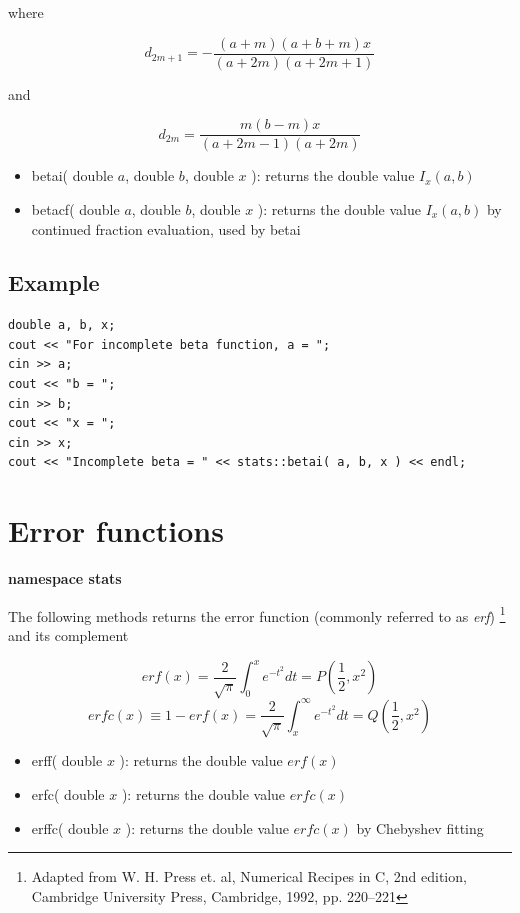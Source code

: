 \documentclass{report}
\begin{document}
where

\begin{equation}
d_{2m+1} = -\frac{(a+m)(a+b+m)x}{(a+2m)(a+2m+1)}
\end{equation}

and

\begin{equation}
d_{2m} = \frac{m(b-m)x}{(a+2m-1)(a+2m)}
\end{equation}

\begin{itemize}
\item betai( double $a$, double $b$, double $x$ ): returns the double
value $I_x(a,b)$
\item betacf( double $a$, double $b$, double $x$ ): returns the double
value $I_x(a,b)$
      by continued fraction evaluation, used by betai
\end{itemize}

\subsection{Example}
\begin{verbatim}
double a, b, x;
cout << "For incomplete beta function, a = ";
cin >> a;
cout << "b = ";
cin >> b;
cout << "x = ";
cin >> x;
cout << "Incomplete beta = " << stats::betai( a, b, x ) << endl;
\end{verbatim}

\section{Error functions}

{\bf namespace stats}

The following methods returns the error function (commonly referred to
as {\em erf})
\footnote{Adapted from W. H. Press et. al, Numerical Recipes in C, 2nd
edition, Cambridge University Press, Cambridge, 1992, pp. 220--221}
and its complement

\begin{equation}
erf(x) = \frac{2}{\sqrt{\pi}}\int_0^x e^{-t^2}dt = P(\frac{1}{2},x^2)
\end{equation}
\begin{equation}
erfc(x) \equiv 1 - erf(x) = \frac{2}{\sqrt{\pi}}\int_x^\infty e^{-t^2}
dt = Q(\frac{1}{2},x^2)
\end{equation}

\begin{itemize}
\item erff( double $x$ ): returns the double value $erf(x)$
\item erfc( double $x$ ): returns the double value $erfc(x)$
\item erffc( double $x$ ): returns the double value $erfc(x)$ by
Chebyshev fitting
\end{itemize}
\end{document}
